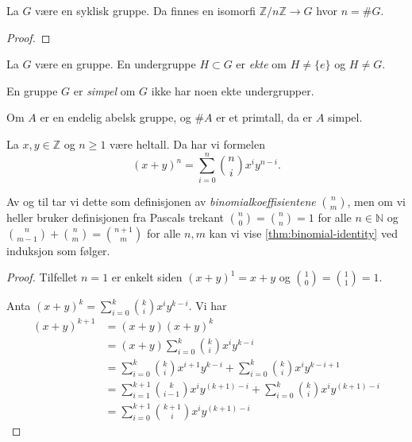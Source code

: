 \begin{corollary}
    La $G$ være en syklisk gruppe.
    Da finnes en isomorfi $\mathbb Z / n\mathbb Z\to G$
    hvor $n = \# G$.
\end{corollary}
\begin{proof}
\end{proof}

\begin{definition}
    La $G$ være en gruppe.
    En undergruppe $H\subset G$ er \textit{ekte}
    om $H\neq \{e\}$ og $H\neq G$.

    En gruppe $G$ er \textit{simpel} om $G$ ikke har noen ekte undergrupper.
\end{definition}

\begin{theorem}
    Om $A$ er en endelig abelsk gruppe, og $\# A$ er et primtall,
    da er $A$ simpel.
\end{theorem}

\begin{lemma}\label{thm:binomial-identity}
    La $x,y\in \mathbb Z$  og $n \geq 1$ være heltall.
    Da har vi formelen
    \[
        (x + y)^n = \sum_{i = 0}^n \binom n i x^i y^{n - i}.
    \]
\end{lemma}

Av og til tar vi dette som definisjonen av \textit{binomialkoeffisientene}
$\binom n m$,
men om vi heller bruker definisjonen fra Pascals trekant $\binom n 0 = \binom n n = 1$
for alle $n\in\mathbb N$ og $\binom n {m - 1} + \binom n m = \binom {n + 1} m$
for alle $n, m$ kan vi vise \cref{thm:binomial-identity} ved induksjon som følger.
\begin{proof}
    Tilfellet $n = 1$ er enkelt siden
    $(x + y)^1 = x + y$ og $\binom 1 0 = \binom 1 1 = 1$.

    Anta $(x + y)^k = \sum_{i = 0}^k \binom k i x^i y^{k - i}$.
    Vi har
    \[\begin{aligned}
        (x + y)^{k + 1}
        &=  (x + y)(x + y)^k
        \\
        &= (x + y)\sum_{i = 0}^k \binom k i x^i y^{k - i}
        \\
        &= \sum_{i = 0}^k \binom k i x^{i + 1} y^{k - i}
        + \sum_{i = 0}^k \binom k i x^{i} y^{k - i + 1}
        \\
        &= \sum_{i = 1}^{k + 1} \binom k {i - 1} x^{i} y^{(k + 1) - i}
        + \sum_{i = 0}^k \binom k i x^{i} y^{(k + 1) - i}
        \\
        &= \sum_{i = 0}^{k + 1} \binom {k + 1} i x^{i} y^{(k + 1) - i}
    \end{aligned}\]
\end{proof}

